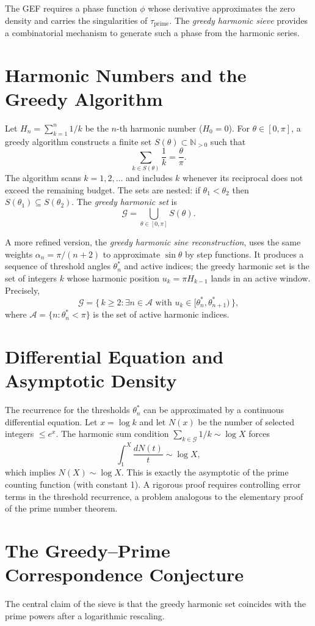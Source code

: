 \documentclass[12pt,a4paper,twoside]{book}
\newcommand{\N}{\mathbb{N}}
\begin{document}
The GEF requires a phase function \(\phi\) whose derivative approximates the zero density and carries the singularities of \(\tau_{\text{prime}}\).  The \emph{greedy harmonic sieve} provides a combinatorial mechanism to generate such a phase from the harmonic series.

\section{Harmonic Numbers and the Greedy Algorithm}
Let \(H_n = \sum_{k=1}^{n} 1/k\) be the \(n\)-th harmonic number (\(H_0=0\)).  For \(\theta\in[0,\pi]\), a greedy algorithm constructs a finite set \(S(\theta)\subset\N_{>0}\) such that
\[
\sum_{k\in S(\theta)} \frac{1}{k} = \frac{\theta}{\pi}.
\]
The algorithm scans \(k=1,2,\dots\) and includes \(k\) whenever its reciprocal does not exceed the remaining budget.  The sets are nested: if \(\theta_1<\theta_2\) then \(S(\theta_1)\subseteq S(\theta_2)\).  The \emph{greedy harmonic set} is
\[
\mathcal{G} = \bigcup_{\theta\in[0,\pi]} S(\theta).
\]

A more refined version, the \emph{greedy harmonic sine reconstruction}, uses the same weights \(\alpha_n = \pi/(n+2)\) to approximate \(\sin\theta\) by step functions.  It produces a sequence of threshold angles \(\theta_n^*\) and active indices; the greedy harmonic set is the set of integers \(k\) whose harmonic position \(u_k = \pi H_{k-1}\) lands in an active window.  Precisely,
\[
\mathcal{G} = \{\, k\ge 2 : \exists n\in\mathcal{A} \text{ with } u_k \in [\theta_n^*,\theta_{n+1}^*) \,\},
\]
where \(\mathcal{A} = \{n : \theta_n^* < \pi\}\) is the set of active harmonic indices.

\section{Differential Equation and Asymptotic Density}
The recurrence for the thresholds \(\theta_n^*\) can be approximated by a continuous differential equation.  Let \(x = \log k\) and let \(N(x)\) be the number of selected integers \(\le e^x\).  The harmonic sum condition \(\sum_{k\in\mathcal{G}} 1/k \sim \log X\) forces
\[
\int_1^X \frac{dN(t)}{t} \sim \log X,
\]
which implies \(N(X) \sim \log X\).  This is exactly the asymptotic of the prime counting function (with constant 1).  A rigorous proof requires controlling error terms in the threshold recurrence, a problem analogous to the elementary proof of the prime number theorem.

\section{The Greedy--Prime Correspondence Conjecture}
The central claim of the sieve is that the greedy harmonic set coincides with the prime powers after a logarithmic rescaling.
\end{document}

